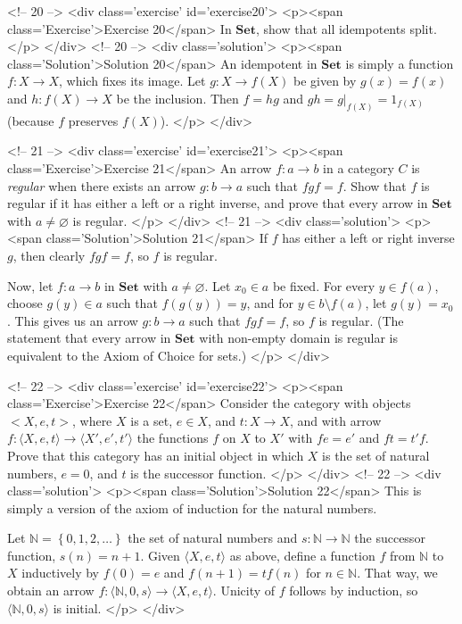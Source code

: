 <!-- 20 -->
<div class='exercise' id='exercise20'>
<p><span class='Exercise'>Exercise 20</span>
In $\mathbf{Set}$, show that all idempotents split.
</p>
</div>
<!-- 20 -->
<div class='solution'>
<p><span class='Solution'>Solution 20</span>
An idempotent in $\mathbf{Set}$ is simply a function $f\colon X\to X$, which fixes its image. Let $g:X\to f(X)$ be given by $g(x)=f(x)$ and $h:f(X)\to X$ be the inclusion. Then $f=hg$ and $gh=g|_{f(X)}=1_{f(X)}$ (because $f$ preserves $f(X)$).
</p>
</div>

<!-- 21 -->
<div class='exercise' id='exercise21'>
<p><span class='Exercise'>Exercise 21</span>
An arrow $f:a\to b$ in a category $C$ is \emph{regular} when there exists an arrow $g:b\to a$ such that $fgf=f$. Show that $f$ is regular if it has either a left or a right inverse, and prove that every arrow in $\mathbf{Set}$ with $a\neq\varnothing$ is regular.
</p>
</div>
<!-- 21 -->
<div class='solution'>
<p><span class='Solution'>Solution 21</span>
If $f$ has either a left or right inverse $g$, then clearly $fgf=f$, so $f$ is regular.

Now, let $f:a\to b$ in $\mathbf{Set}$ with $a\neq\varnothing$. Let $x_0\in a$ be fixed. For every $y\in f(a)$, choose $g(y)\in a$ such that $f(g(y))=y$, and for $y\in b\setminus f(a)$, let $g(y)=x_0$. This gives us an arrow $g:b\to a$ such that $fgf=f$, so $f$ is regular. (The statement that every arrow in $\mathbf{Set}$ with non-empty domain is regular is equivalent to the Axiom of Choice for sets.)
</p>
</div>

<!-- 22 -->
<div class='exercise' id='exercise22'>
<p><span class='Exercise'>Exercise 22</span>
Consider the category with objects $<X,e,t>$, where $X$ is a set, $e\in X$, and $t:X\to X$, and with arrow $f:\langle X,e,t\rangle\to\langle X',e',t'\rangle$ the functions $f$ on $X$ to $X'$ with $fe=e'$ and $ft=t'f$. Prove that this category has an initial object in which $X$ is the set of natural numbers, $e=0$, and $t$ is the successor function.
</p>
</div>
<!-- 22 -->
<div class='solution'>
<p><span class='Solution'>Solution 22</span>
This is simply a version of the axiom of induction for the natural numbers.

Let $\mathbb{N}=\left\{0,1,2,\ldots\right\}$ the set of natural numbers and $s:\mathbb{N}\to\mathbb{N}$ the successor function, $s(n)=n+1$. Given $\langle X,e,t\rangle$ as above, define a function $f$ from $\mathbb{N}$ to $X$ inductively by $f(0)=e$ and $f(n+1)=tf(n)$ for $n\in\mathbb{N}$. That way, we obtain an arrow $f:\langle\mathbb{N},0,s\rangle\to \langle X,e,t\rangle$. Unicity of $f$ follows by induction, so $\langle\mathbb{N},0,s\rangle$ is initial.
</p>
</div>

